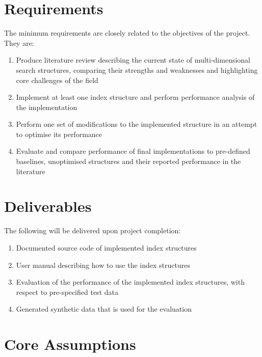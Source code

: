 \section{Requirements}

The minimum requirements are closely related to the objectives of the project. They are:
\begin{enumerate}
	\item Produce literature review describing the current state of multi-dimensional search structures, comparing their strengths and weaknesses and highlighting core challenges of the field
	\item Implement at least one index structure and perform performance analysis of the implementation
	\item Perform one set of modifications to the implemented structure in an attempt to optimise its performance
	\item Evaluate and compare performance of final implementations to pre-defined baselines, unoptimised structures and their reported performance in the literature
\end{enumerate}

\section{Deliverables}

The following will be delivered upon project completion:
\begin{enumerate}
	\item Documented source code of implemented index structures
	\item User manual describing how to use the index structures
	\item Evaluation of the performance of the implemented index structures, with respect to pre-specified test data
	\item Generated synthetic data that is used for the evaluation
\end{enumerate}

\section{Core Assumptions}
\label{sec:core-assumptions}

